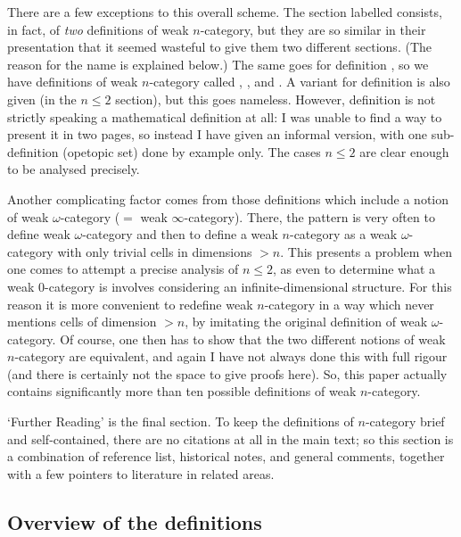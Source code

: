 There are a few exceptions to this overall scheme.  The section labelled
 consists, in fact, of \emph{two} definitions of weak $n$-category, but
they are so similar in their presentation that it seemed wasteful to give
them two different sections.  (The reason for the name  is explained
below.)  The same goes for definition , so we have definitions of weak
$n$-category called , ,  and .  A variant for
definition  is also given (in the $n\leq 2$ section), but this goes
nameless.  However, definition  is not strictly speaking a mathematical
definition at all: I was unable to find a way to present it in two pages, so
instead I have given an informal version, with one sub-definition (opetopic
set) done by example only.  The cases $n\leq 2$ are clear enough to be
analysed precisely.

Another complicating factor comes from those definitions which include a
notion of weak $\omega$-category ($=$ weak $\infty$-category).  There, the
pattern is very often to define weak $\omega$-category and then to define a
weak $n$-category as a weak $\omega$-category with only trivial cells in
dimensions $>n$.  This presents a problem when one comes to attempt a precise
analysis of $n\leq 2$, as even to determine what a weak $0$-category is
involves considering an infinite-dimensional structure.  For this reason it
is more convenient to redefine weak $n$-category in a way which never
mentions cells of dimension $>n$, by imitating the original definition of
weak $\omega$-category.  Of course, one then has to show that the two
different notions of weak $n$-category are equivalent, and again I have not
always done this with full rigour (and there is certainly not the space to
give proofs here).  So, this paper actually contains significantly more than
ten possible definitions of weak $n$-category.

`Further Reading' is the final section.  To keep the definitions of
$n$-category brief and self-contained, there are no citations at all in the
main text; so this section is a combination of reference list, historical
notes, and general comments, together with a few pointers to literature in
related areas.


\subsection*{Overview of the definitions}

